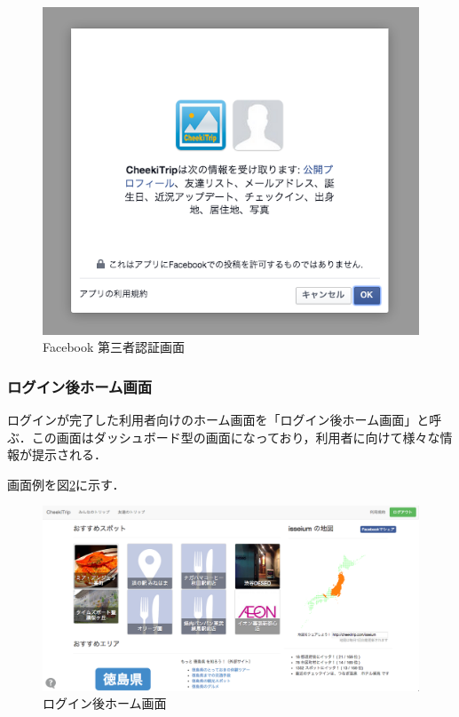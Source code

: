 \documentclass{jsarticle}
\begin{document}
\begin{figure}[!ht]
\begin{center}
\includegraphics[width=12cm]{./image/cheekitrip_auth_with_facebook.png}
\caption{Facebook 第三者認証画面}
\label{screen_auth_with_facebook}
\end{center}
\end{figure}

\subsubsection{ログイン後ホーム画面}

ログインが完了した利用者向けのホーム画面を「ログイン後ホーム画面」と呼ぶ．この画面はダッシュボード型の画面になっており，利用者に向けて様々な情報が提示される．

画面例を図\ref{cheekitrip_home}に示す．

\begin{figure}[!ht]
\begin{center}
\includegraphics[width=12.0cm]{./image/cheekitrip_home.png}
\caption{ログイン後ホーム画面}
\label{cheekitrip_home}
\end{center}
\end{figure}
\end{document}
